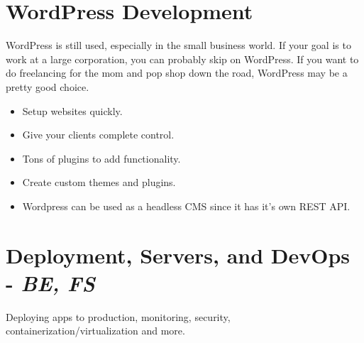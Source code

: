 \section{WordPress Development}
WordPress is still used, especially in the small business world. If your goal is to work at a large corporation, you can probably skip on WordPress. If you want to do freelancing for the mom and pop shop down the road, WordPress may be a pretty good choice. 

\begin{itemize}
    \item Setup websites quickly.
    \item Give your clients complete control.
    \item Tons of plugins to add functionality.
    \item Create custom themes and plugins.
    \item Wordpress can be used as a headless CMS since it has it's own REST API.
\end{itemize}

\section{Deployment, Servers, and DevOps - \emph{BE, FS}}
Deploying apps to production, monitoring, security, containerization/virtualization and more.

